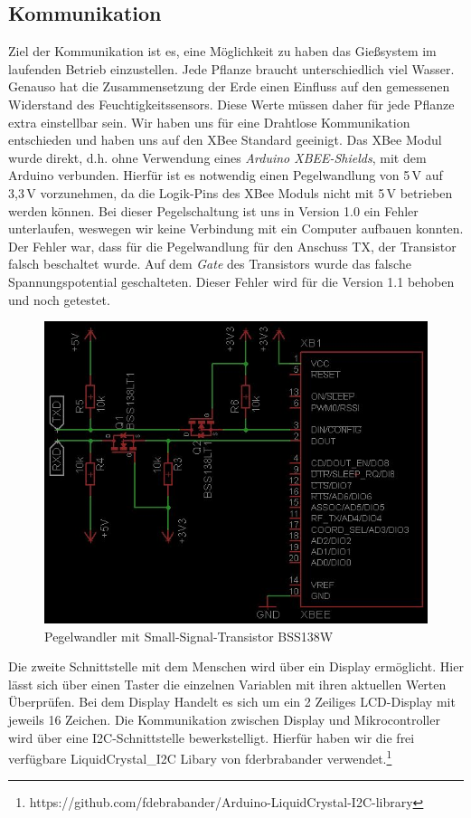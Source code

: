 \documentclass[]{IEEEtran}
\begin{document}
\subsection{Kommunikation}
Ziel der Kommunikation ist es, eine Möglichkeit zu haben das Gießsystem im laufenden Betrieb einzustellen. Jede Pflanze braucht unterschiedlich viel Wasser. Genauso hat die Zusammensetzung der Erde einen Einfluss auf den gemessenen Widerstand des Feuchtigkeitssensors. Diese Werte müssen daher für jede Pflanze extra einstellbar sein. 
Wir haben uns für eine Drahtlose Kommunikation entschieden und haben uns auf den XBee Standard geeinigt. Das XBee Modul wurde direkt, d.h. ohne Verwendung eines \emph{Arduino XBEE-Shields}, mit dem Arduino verbunden. Hierfür ist es notwendig einen Pegelwandlung von 5\,V auf 3,3\,V vorzunehmen, da die Logik-Pins des XBee Moduls nicht mit 5\,V betrieben werden können. Bei dieser Pegelschaltung ist uns in Version 1.0 ein Fehler unterlaufen, weswegen wir keine Verbindung mit ein Computer aufbauen konnten. Der Fehler war, dass für die Pegelwandlung für den Anschuss TX, der Transistor falsch beschaltet wurde. Auf dem \emph{Gate} des Transistors wurde das falsche Spannungspotential geschalteten. Dieser Fehler wird für die Version 1.1 behoben und noch getestet.
\begin{figure}
	\centering
	\includegraphics[width=0.8\linewidth]{bilder/v1SchaltplanXbee.jpg}
	\caption{Pegelwandler mit Small-Signal-Transistor BSS138W }
	\label{fig-Pegel}
\end{figure}


		
Die zweite Schnittstelle mit dem Menschen wird über ein Display ermöglicht. Hier lässt sich über einen Taster die einzelnen Variablen mit ihren aktuellen Werten Überprüfen. Bei dem Display Handelt es sich um ein 2 Zeiliges LCD-Display mit jeweils 16 Zeichen. Die Kommunikation zwischen Display und Mikrocontroller wird über eine I2C-Schnittstelle bewerkstelligt. Hierfür haben wir die frei verfügbare LiquidCrystal\_I2C Libary von fderbrabander verwendet.\footnote{https://github.com/fdebrabander/Arduino-LiquidCrystal-I2C-library}
		
\end{document}
